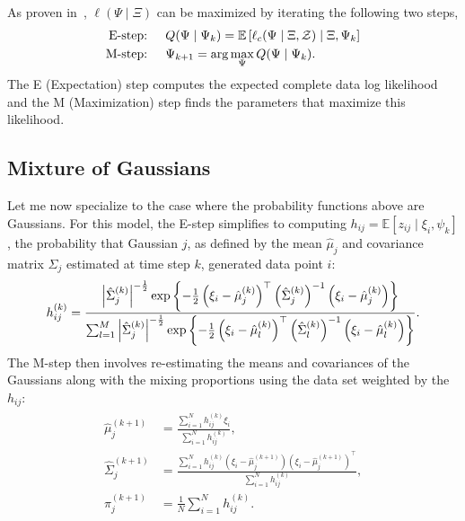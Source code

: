 As proven in~\cite{dempster1977maximum}, $\ell(\Psi \mid \Xi)$ can be maximized
by iterating the following two steps,
%
\begin{align}
    \begin{split}
    \text{E-step: } \quad &Q(\Psi \mid \Psi_k) = \mathbb{E}\left[ \ell_c(\Psi \mid \Xi, \mathcal{Z}) \mid \Xi, \Psi_k \right] \\
    \text{M-step: } \quad &\Psi_{k+1} = \arg \max_\Psi Q(\Psi \mid \Psi_k).
    \end{split}
    \label{eq:EM_alg}
\end{align}
%
The E (Expectation) step computes the expected complete data log likelihood and 
the M (Maximization) step finds the parameters that maximize this likelihood.

\subsection{Mixture of Gaussians}
Let me now specialize to the case where the probability functions above are
Gaussians. For this model, the E-step simplifies to computing $h_{ij} =
\mathbb{E}\left[ z_{ij} \mid \xi_i, \psi_k \right]$, the probability that
Gaussian $j$, as defined by the mean $\hat{\mu}_j$ and covariance matrix
$\hat{\Sigma}_j$ estimated at time step $k$, generated data point $i$:
%
\begin{equation}
    h_{ij}^{(k)} = \frac{\left|{\hat{\Sigma}_j^{(k)}}\right|^{-\frac{1}{2}} 
    \exp{\left\{-\frac{1}{2}\left( \xi_i - \hat{\mu}_j^{(k)} \right)^\top 
    \left({\hat{\Sigma}_j^{(k)}}\right)^{-1} \left( \xi_i - \hat{\mu}_j^{(k)} \right) \right\}}  }
    {\sum_{l=1}^M \left|{\hat{\Sigma}_j^{(k)}}\right|^{-\frac{1}{2}} 
    \exp{\left\{-\frac{1}{2}\left( \xi_i - \hat{\mu}_l^{(k)} \right)^\top 
    \left({\hat{\Sigma}_l^{(k)}}\right)^{-1} \left( \xi_i - \hat{\mu}_l^{(k)} \right) \right\}} }.
    \label{eq:E-step}
\end{equation}
%
The M-step then involves re-estimating the means and covariances of the
Gaussians along with the mixing proportions using the data set weighted by the
$h_{ij}$:
%
\begin{align}
    \begin{split}
    \hat{\mu}_j^{(k+1)} &= \frac{\sum_{i=1}^N h_{ij}^{(k)}\xi_i}{\sum_{i=1}^N h_{ij}^{(k)}}, \\
    \hat{\Sigma}_j^{(k+1)} &= \frac{\sum_{i=1}^N h_{ij}^{(k)} \left(\xi_i - \hat{\mu}_j^{(k+1)}\right)
                    \left(\xi_i - \hat{\mu}_j^{(k+1)}\right)^\top}{\sum_{i=1}^N h_{ij}^{(k)}}, \\
    \pi_j^{(k+1)} &= \frac{1}{N}\sum_{i=1}^N h_{ij}^{(k)}.
    \end{split}
    \label{eq:M-step}
\end{align}


